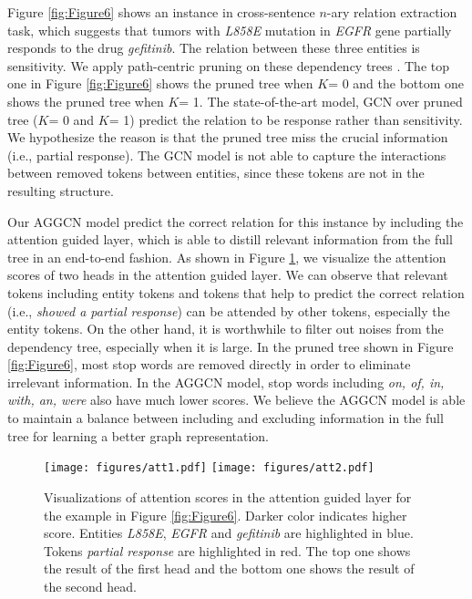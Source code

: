 \documentclass[11pt,a4paper]{article}
\begin{document}
Figure \ref{fig:Figure6} shows an instance in cross-sentence $n$-ary relation extraction task, which suggests that tumors with \textit{L858E} mutation in \textit{EGFR} gene partially responds to the drug \textit{gefitinib}. The relation between these three entities is sensitivity. We apply path-centric pruning on these dependency trees \citep{Zhang2018GraphCO}. The top one in Figure \ref{fig:Figure6} shows the pruned tree when $K$= 0 and the bottom one shows the pruned tree when $K$= 1. The state-of-the-art model, GCN over pruned tree ($K$= 0 and $K$= 1) \citep{Zhang2018GraphCO} predict the relation to be response rather than sensitivity. We hypothesize the reason is that the pruned tree miss the crucial information (i.e., partial response). The GCN model is not able to capture the interactions between removed tokens between entities, since these tokens are not in the resulting structure. 

Our AGGCN model predict the correct relation for this instance by including the attention guided layer, which is able to distill relevant information from the full tree in an end-to-end fashion. As shown in Figure \ref{fig:Figure5}, we visualize the attention scores of two heads in the attention guided layer. We can observe that relevant tokens including entity tokens and tokens that help to predict the correct relation (i.e., \textit{showed a partial  response}) can be attended by other tokens, especially the entity tokens. On the other hand, it is worthwhile to filter out noises from the dependency tree, especially when it is large. In the pruned tree shown in Figure \ref{fig:Figure6}, most stop words are removed directly in order to eliminate irrelevant information. In the AGGCN model, stop words including \textit{on, of, in, with, an, were} also have much lower scores. We believe the AGGCN model is able to maintain a balance between including and excluding information in the full tree for learning a better graph representation.

\begin{figure}
    \centering
    \texttt{[image: figures/att1.pdf]}
    \texttt{[image: figures/att2.pdf]}
    \caption{Visualizations of attention scores in the attention guided layer for the example in Figure \ref{fig:Figure6}. Darker color indicates higher score. Entities \textit{L858E}, \textit{EGFR} and \textit{gefitinib} are highlighted in blue. Tokens \textit{partial response} are highlighted in red. The top one shows the result of the first head and the bottom one shows the result of the second head.}
    \label{fig:Figure5}
\end{figure}
\end{document}
